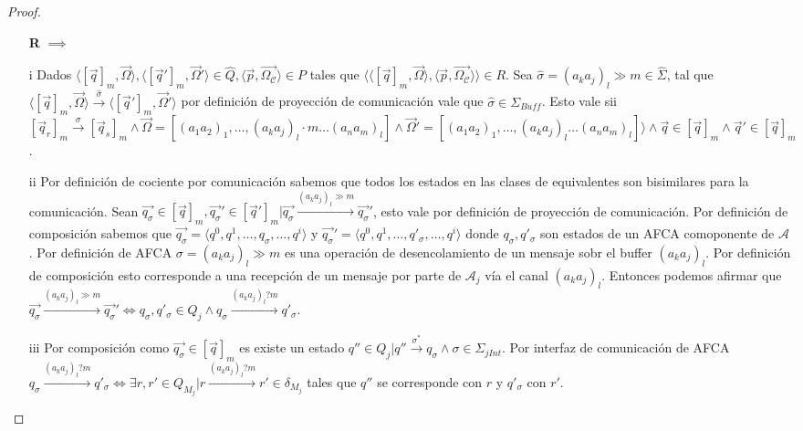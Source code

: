 \begin{proof}
\begin{itemize}
    \item[\textbf{R} $\implies$]
 
    \item[i] Dados $\langle [\overrightarrow{q}]_m, \overrightarrow{\Omega} \rangle, \langle [\overrightarrow{q}']_m, \overrightarrow{\Omega}' \rangle \in \hat{Q}, \langle \overrightarrow{p}, \overrightarrow{\Omega_\mathcal{C}} \rangle \in P$ tales que $\langle \langle [\overrightarrow{q}]_m, \overrightarrow{\Omega} \rangle, \langle \overrightarrow{p}, \overrightarrow{\Omega_\mathcal{C}} \rangle \rangle \in R$. Sea $\hat{\sigma}= (a_ka_j)_l \gg m \in \hat{\Sigma}$, tal que $\langle [\overrightarrow{q}]_m, \overrightarrow{\Omega} \rangle \xrightarrow{\hat{\sigma}} \langle [\overrightarrow{q}']_m, \overrightarrow{\Omega}' \rangle$ por definición de proyección de comunicación vale que $\hat{\sigma} \in \Sigma_{Buff}$.  Esto vale sii $[\overrightarrow{q}_r]_m \xrightarrow{\sigma} [\overrightarrow{q}_s]_m \land \overrightarrow{\Omega} = [(a_1a_2)_1, \ldots, (a_ka_j)_l \cdot m \ldots (a_na_m)_l] \land \overrightarrow{\Omega}' = [(a_1a_2)_1, \ldots, (a_ka_j)_l \ldots (a_na_m)_l] \rangle \land \overrightarrow{q} \in [\overrightarrow{q}]_m \land \overrightarrow{q}' \in [\overrightarrow{q}]_m$.
    
    \item[ii] Por definición de cociente por comunicación sabemos que todos los estados en las clases de equivalentes son bisimilares para la comunicación. Sean $\overrightarrow{q_{\sigma}} \in [\overrightarrow{q}]_m, \overrightarrow{q_{\sigma}}' \in [\overrightarrow{q}']_m| \overrightarrow{q_{\sigma}} \xrightarrow{(a_ka_j)_l \gg m} \overrightarrow{q_{\sigma}}'$, esto vale por definición de proyección de comunicación. Por definición de composición sabemos que $\overrightarrow{q_{\sigma}} =\langle q^0, q^1, \ldots, q_{\sigma}, \ldots,q^i \rangle$ y $\overrightarrow{q_{\sigma}}' =\langle q^0, q^1, \ldots, q'_{\sigma}, \ldots,q^i \rangle$ donde $q_{\sigma},q'_{\sigma}$ son estados de un AFCA comoponente de $\mathcal{A}$. Por definición de AFCA $\sigma=(a_ka_j)_l \gg m$ es una operación de desencolamiento de un mensaje sobr el buffer $(a_ka_j)_l$. Por definición de composición esto corresponde a una recepción de un mensaje por parte de $\mathcal{A}_j$ vía el canal $(a_ka_j)_l$. Entonces podemos afirmar que $\overrightarrow{q_{\sigma}} \xrightarrow{(a_ka_j)_l \gg m} \overrightarrow{q_{\sigma}}' \iff q_{\sigma},q'_{\sigma} \in Q_j \land q_{\sigma} \xrightarrow{(a_ka_j)_l?m} q'_{\sigma}$.
    
    \item[iii] Por composición como $\overrightarrow{q_{\sigma}} \in [\overrightarrow{q}]_m$ es existe un estado $q'' \in Q_j | q'' \xrightarrow{\sigma^*} q_{\sigma} \land \sigma \in \Sigma_{jInt}$. Por interfaz de comunicación de AFCA $q_{\sigma} \xrightarrow{(a_ka_j)_l?m} q'_{\sigma} \iff \exists r, r' \in Q_{M_j} | r \xrightarrow{(a_ka_j)_l?m} r' \in \delta_{M_j}$ tales que $q''$ se corresponde con $r$ y $q'_{\sigma}$ con $r'$.  
    

\end{itemize}
\end{proof}
